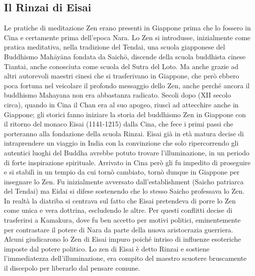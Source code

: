\documentclass[10pt,a4paper]{report}
\begin{document}
\subsection{Il Rinzai di Eisai}
Le pratiche di meditazione Zen erano presenti in Giappone prima che lo fossero in Cina e certamente prima dell'epoca Nara. Lo Zen si introdusse, inizialmente come pratica meditativa, nella tradizione del Tendai, una scuola giapponese del Buddhismo Mahāyāna fondata da Saichō, discende della scuola buddhista cinese Tiantai, anche conosciuta come scuola del Sutra del Loto. Ma anche grazie ad altri autorevoli maestri cinesi che si trasferivano in Giappone, che però ebbero poca fortuna nel veicolare il profondo messaggio dello Zen, anche perché ancora il buddhismo Mahayana non era abbastanza radicato. Secoli dopo (XII secolo circa), quando in Cina il Chan era al suo apogeo, riuscì ad attecchire anche in Giappone; gli storici fanno iniziare la storia del buddhismo Zen in Giappone con il ritorno del monaco Eisai (1141-1215) dalla Cina, che fece i primi passi che porteranno alla fondazione della scuola Rinzai. Eisai già in età matura decise di intraprendere un viaggio in India con la convinzione che solo ripercorrendo gli autentici luoghi del Buddha avrebbe potuto trovare l'illuminazione, in un periodo di forte inspirazione spirituale. Arrivato in Cina però gli fu impedito di proseguire e si stabilì in un tempio da cui tornò cambiato, tornò dunque in Giappone per insegnare lo Zen. Fu inizialmente avversato dall'establishment (Saicho patriarca del Tendai) ma Eidai si difese sostenendo che lo stesso Saicho professava lo Zen. In realtà la diatriba si centrava sul fatto che Eisai pretendeva di porre lo Zen come unica e vera dottrina, escludendo le altre. Per questi conflitti decise di trasferirsi a Kamakura, dove fu ben accetto per motivi politici, eminentemente per contrastare il potere di Nara da parte della nuova aristocrazia guerriera. Alcuni giudicarono lo Zen di Eisai impuro poiché intriso di influenze esoteriche imposte dal potere politico. Lo zen di Eisai è detto Rinzai e sostiene l'immediatezza dell'illuminazione, era compito del maestro scuotere bruscamente il discepolo per liberarlo dal pensare comune. 
\end{document}
